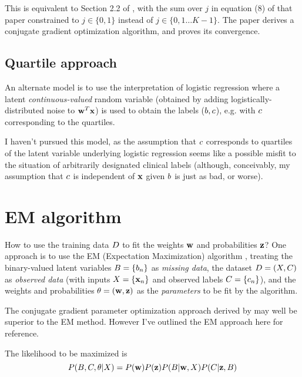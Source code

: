 \documentclass{article}
\begin{document}
This is equivalent to Section 2.2 of \cite{BootkrajangKaban2012},
with the sum over $j$ in equation (8) of that paper constrained to $j\in\{0,1\}$
instead of $j\in\{0,1\ldots K-1\}$.
The paper derives a conjugate gradient optimization algorithm,
and proves its convergence.

\subsection{Quartile approach}

An alternate model is to use the interpretation of logistic regression where a latent {\em continuous-valued} random variable
(obtained by adding logistically-distributed noise to ${\bf w}^T {\bf x}$)
is used to obtain the labels ($b,c$),
e.g. with $c$ corresponding to the quartiles.

I haven't pursued this model, as the assumption that $c$ corresponds to quartiles of the latent variable underlying
logistic regression seems like a possible misfit to the situation of arbitrarily designated clinical labels
(although, conceivably, my assumption that $c$ is independent of ${\bf x}$ given $b$ is just as bad, or worse).


\section{EM algorithm}

How to use the training data $D$ to fit the weights ${\bf w}$ and probabilities ${\bf z}$?
One approach is to use the EM (Expectation Maximization) algorithm \cite{DempsterLairdRubin77},
treating the binary-valued latent variables $B = \{ b_n \}$ as {\em missing data},
the dataset $D = (X,C)$ as {\em observed data}
(with inputs $X = \{ {\bf x}_n \}$ and observed labels $C = \{ c_n \}$),
and the weights and probabilities $\theta = ({\bf w},{\bf z})$ as the {\em parameters} to be fit by the algorithm.

The conjugate gradient parameter optimization approach
derived by \cite{BootkrajangKaban2012} may well be superior to the EM method.
However I've outlined the EM approach here for reference.

The likelihood to be maximized is
\[
P(B,C,\theta|X)
= P({\bf w}) P({\bf z}) P(B|{\bf w},X) P(C|{\bf z},B)
\]
\end{document}
